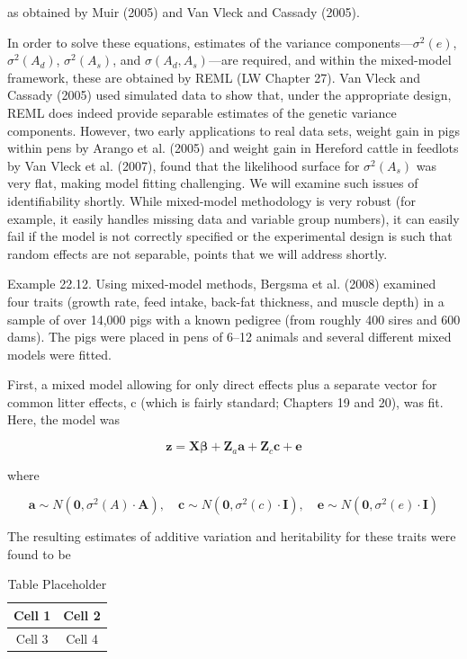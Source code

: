 \documentclass{article}
\begin{document}
as obtained by Muir (2005) and Van Vleck and Cassady (2005).

In order to solve these equations, estimates of the variance components—$\sigma^{2}(e)$, $\sigma^{2}(A_{d})$, $\sigma^{2}(A_{s})$, and $\sigma(A_{d}, A_{s})$—are required, and within the mixed-model framework, these are obtained by REML (LW Chapter 27). Van Vleck and Cassady (2005) used simulated data to show that, under the appropriate design, REML does indeed provide separable estimates of the genetic variance components. However, two early applications to real data sets, weight gain in pigs within pens by Arango et al. (2005) and weight gain in Hereford cattle in feedlots by Van Vleck et al. (2007), found that the likelihood surface for $\sigma^{2}(A_{s})$ was very flat, making model fitting challenging. We will examine such issues of identifiability shortly. While mixed-model methodology is very robust (for example, it easily handles missing data and variable group numbers), it can easily fail if the model is not correctly specified or the experimental design is such that random effects are not separable, points that we will address shortly.

Example 22.12. Using mixed-model methods, Bergsma et al. (2008) examined four traits (growth rate, feed intake, back-fat thickness, and muscle depth) in a sample of over 14,000 pigs with a known pedigree (from roughly 400 sires and 600 dams). The pigs were placed in pens of 6–12 animals and several different mixed models were fitted.

First, a mixed model allowing for only direct effects plus a separate vector for common litter effects, c (which is fairly standard; Chapters 19 and 20), was fit. Here, the model was

\begin{equation}
\mathbf{z}=\mathbf{X}\boldsymbol{\beta}+\mathbf{Z}_{a}\mathbf{a}+\mathbf{Z}_{c}\mathbf{c}+\mathbf{e}
\end{equation}

where

\begin{equation}
\mathbf{a}\sim N(\mathbf{0},\sigma^{2}(A)\cdot\mathbf{A}),\quad\mathbf{c}\sim N(\mathbf{0},\sigma^{2}(c)\cdot\mathbf{I}),\quad\mathbf{e}\sim N(\mathbf{0},\sigma^{2}(e)\cdot\mathbf{I})
\end{equation}

The resulting estimates of additive variation and heritability for these traits were found to be

\begin{table}[h]
\centering
\begin{tabular}{|c|c|}
\hline
Cell 1 & Cell 2 \\
\hline
Cell 3 & Cell 4 \\
\hline
\end{tabular}
\caption{Table Placeholder}
\end{table}
\end{document}
